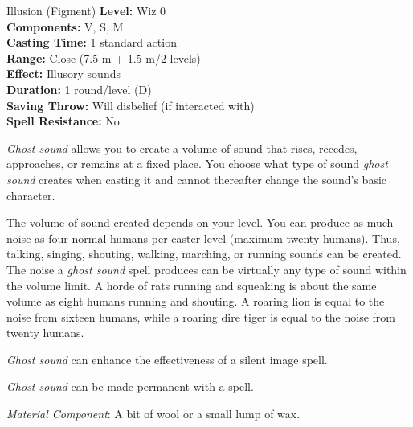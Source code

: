 {Illusion (Figment)}
{
	\textbf{Level:}
	Wiz 0\\
	\textbf{Components:}
	V, S, M\\
	\textbf{Casting Time:}
	1 standard action\\
	\textbf{Range:}
	Close (7.5 m + 1.5 m/2 levels)\\
	\textbf{Effect:}
	Illusory sounds\\
	\textbf{Duration:}
	1 round/level (D)\\
	\textbf{Saving Throw:}
	Will disbelief (if interacted with)\\
	\textbf{Spell Resistance:}
	No\\
}
{
	\emph{Ghost sound} allows you to create a volume of sound that rises, recedes, approaches, or remains at a fixed place. You choose what type of sound \emph{ghost sound} creates when casting it and cannot thereafter change the sound's basic character.

	The volume of sound created depends on your level. You can produce as much noise as four normal humans per caster level (maximum twenty humans). Thus, talking, singing, shouting, walking, marching, or running sounds can be created. The noise a \emph{ghost sound} spell produces can be virtually any type of sound within the volume limit. A horde of rats running and squeaking is about the same volume as eight humans running and shouting. A roaring lion is equal to the noise from sixteen humans, while a roaring dire tiger is equal to the noise from twenty humans.

	\emph{Ghost sound} can enhance the effectiveness of a silent image spell.

	\emph{Ghost sound} can be made permanent with a  spell.

	\textit{Material Component}:
	A bit of wool or a small lump of wax.

}
